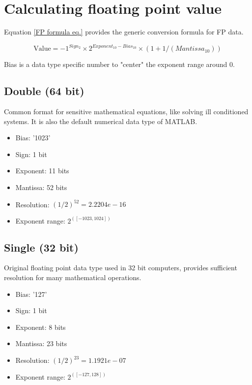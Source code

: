 \section{Calculating floating point value}

Equation \ref{FP formula eq.} provides the generic conversion formula for FP data. 

\begin{equation} \label{FP formula eq.}
    \text{Value} = -1^{Sign_{2}} \times 2^{Exponent_{10} - Bias_{10}} \times (1 + 1/(Mantissa_{10}))
\end{equation}

\noindent Bias is a data type specific number to "center" the exponent range around 0.

\subsection*{Double (64 bit)}

Common format for sensitive mathematical equations, like solving ill conditioned systems. It is also the default numerical data type of MATLAB.\autocite[]{wiki_double}

\begin{itemize}
    \item Bias: '1023'
    \item Sign: 1 bit
    \item Exponent: 11 bits
    \item Mantissa: 52 bits
    \item Resolution: $ (1/2)^{52} = 2.2204e-16 $
    \item Exponent range: $ 2^{([-1023,1024])} $
\end{itemize}

\subsection*{Single (32 bit)}

Original floating point data type used in 32 bit computers, provides sufficient resolution for many mathematical operations.\autocite[]{wiki_single}

\begin{itemize}
    \item Bias: '127'
    \item Sign: 1 bit
    \item Exponent: 8 bits
    \item Mantissa: 23 bits
    \item Resolution: $ (1/2)^{23} = 1.1921e-07 $
    \item Exponent range: $ 2^{([-127,128])} $
\end{itemize}

